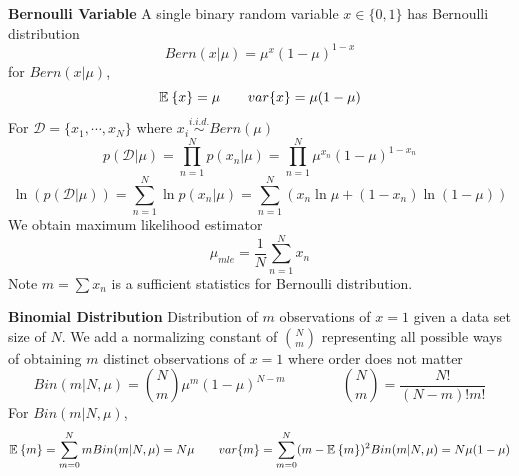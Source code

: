 \documentclass[11pt]{article}
\begin{document}

\begin{defn*}
    \textbf{Bernoulli Variable} A single binary random variable $x\in \{0,1\}$ has Bernoulli distribution
    \[
        Bern(x|\mu) = \mu^x (1-\mu)^{1-x}   
    \]
    for $Bern(x|\mu)$, 
    \[
        \mathbb{E}_{}\left\{x\right\} = \mu 
        \quad \quad 
        var\{x\} = \mu(1-\mu)
    \]
    For $\mathcal{D} = \{x_1, \cdots, x_N\}$ where $x_i \overset{i.i.d.}{\sim} Bern(\mu)$
    \[
        p(\mathcal{D}|\mu)
        = \prod_{n=1}^N p(x_n | \mu)
        = \prod_{n=1}^N \mu^{x_n}(1-\mu)^{1-x_n}
    \] 
    \[
        \ln(p(\mathcal{D}|\mu))
        = \sum_{n=1}^N \ln{p(x_n|\mu)}
        = \sum_{n=1}^N \left(
            x_n\ln{\mu} + (1-x_n)\ln{(1-\mu)}
            \right)
    \]
    We obtain maximum likelihood estimator 
    \[
        \mu_{mle} = \frac{1}{N} \sum_{n=1}^N x_n    
    \]
    Note $m = \sum x_n$ is a sufficient statistics for Bernoulli distribution. 
\end{defn*}

\begin{defn*}
    \textbf{Binomial Distribution} Distribution of $m$ observations of $x=1$ given a data set size of $N$. We add a normalizing constant of $\binom{N}{m}$ representing all possible ways of obtaining $m$ distinct observations of $x=1$ where order does not matter
    \[
        Bin(m|N,\mu) = \binom{N}{m} \mu^m (1-\mu)^{N-m}
        \quad \quad \quad \quad 
        \binom{N}{m} = \frac{N!}{(N-m)!m!}
    \]
    For $Bin(m|N,\mu)$,
    \[
        \mathbb{E}_{}\left\{m\right\} = \sum_{m=0}^N m Bin(m|N,\mu)= N\mu
        \quad \quad 
        var\{m\} = \sum_{m=0}^N (m-\mathbb{E}_{}\left\{m\right\})^2 Bin(m|N,\mu) = N\mu(1-\mu)
    \]
\end{defn*}
\end{document}
